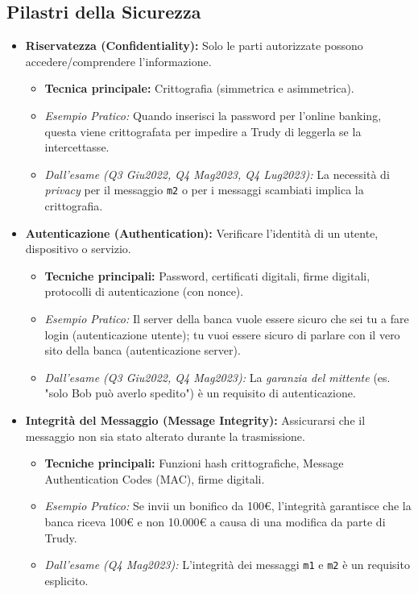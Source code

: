 \subsection{Pilastri della Sicurezza}
\begin{itemize}
    \item \textbf{Riservatezza (Confidentiality):} Solo le parti autorizzate possono accedere/comprendere l'informazione.
    \begin{itemize}
        \item \textbf{Tecnica principale:} Crittografia (simmetrica e asimmetrica).
        \item \emph{Esempio Pratico:} Quando inserisci la password per l'online banking, questa viene crittografata per impedire a Trudy di leggerla se la intercettasse.
        \item \emph{Dall'esame (Q3 Giu2022, Q4 Mag2023, Q4 Lug2023):} La necessità di \textit{privacy} per il messaggio \texttt{m2} o per i messaggi scambiati implica la crittografia.
    \end{itemize}

    \item \textbf{Autenticazione (Authentication):} Verificare l'identità di un utente, dispositivo o servizio.
    \begin{itemize}
        \item \textbf{Tecniche principali:} Password, certificati digitali, firme digitali, protocolli di autenticazione (con nonce).
        \item \emph{Esempio Pratico:} Il server della banca vuole essere sicuro che sei tu a fare login (autenticazione utente); tu vuoi essere sicuro di parlare con il vero sito della banca (autenticazione server).
        \item \emph{Dall'esame (Q3 Giu2022, Q4 Mag2023):} La \textit{garanzia del mittente} (es. "solo Bob può averlo spedito") è un requisito di autenticazione.
    \end{itemize}

    \item \textbf{Integrità del Messaggio (Message Integrity):} Assicurarsi che il messaggio non sia stato alterato durante la trasmissione.
    \begin{itemize}
        \item \textbf{Tecniche principali:} Funzioni hash crittografiche, Message Authentication Codes (MAC), firme digitali.
        \item \emph{Esempio Pratico:} Se invii un bonifico da 100€, l'integrità garantisce che la banca riceva 100€ e non 10.000€ a causa di una modifica da parte di Trudy.
        \item \emph{Dall'esame (Q4 Mag2023):} L'integrità dei messaggi \texttt{m1} e \texttt{m2} è un requisito esplicito.
    \end{itemize}


\end{itemize}
